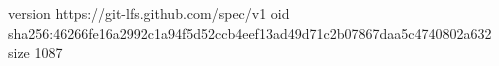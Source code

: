 version https://git-lfs.github.com/spec/v1
oid sha256:46266fe16a2992c1a94f5d52ccb4eef13ad49d71c2b07867daa5c4740802a632
size 1087
